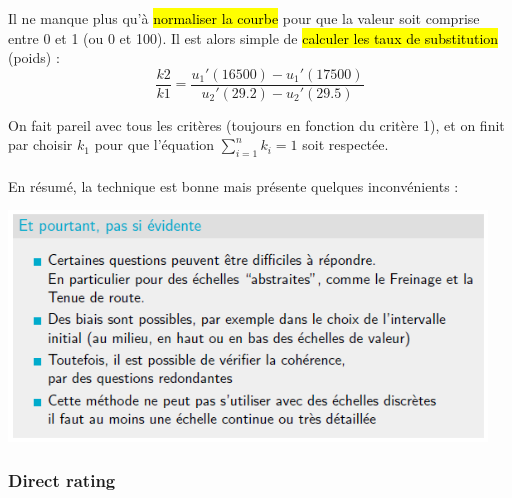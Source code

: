 \documentclass[a4paper, 12pt]{article}
\newcommand{\alinea}{
\hspace*{0.5cm}}
\begin{document}
			\alinea Il ne manque plus qu'à \hl{normaliser la courbe} pour que la valeur soit comprise entre 0 et 1 (ou 0 et 100). 
				Il est alors simple de \hl{calculer les taux de substitution} (poids) :
				$$ \frac{k2}{k1} = \frac{u_1'(16500) - u_1'(17500)}{u_2'(29.2) - u_2'(29.5)} $$
			\alinea On fait pareil avec tous les critères (toujours en fonction du critère 1), et on finit par choisir $k_1$
				pour que l'équation $\sum\limits^{n}_{i=1} k_i = 1$ soit respectée.\\
			~\\
			\alinea En résumé, la technique est bonne mais présente quelques inconvénients :
				\begin{center}
					\includegraphics[width=5in]{Images/indifference3}
				\end{center}
		\subsubsection{Direct rating}
\end{document}
